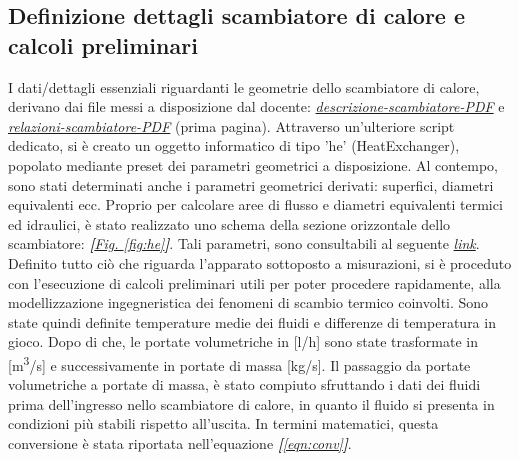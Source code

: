 \documentclass[a4paper,10pt]{article}                                                                                       %
\begin{document}
\subsection{Definizione dettagli scambiatore di calore e calcoli preliminari}                                               %
\label{subsec:hedef_precalcs}                                                                                               %
  I dati/dettagli essenziali riguardanti le geometrie dello scambiatore di calore, derivano dai file messi a disposizione
  dal docente:
  \textit{\href{https://github.com/CristianMerli/DataAnalysis/blob/master/lab_doc/DescrizioneScambiatore.pdf}{descrizione-scambiatore-PDF}}
  e \textit{\href{https://github.com/CristianMerli/DataAnalysis/blob/master/lab_doc/RelazioniScambiatore.pdf}{relazioni-scambiatore-PDF}}
  (prima pagina). Attraverso un'ulteriore script dedicato, si è creato un oggetto informatico di tipo 'he' (HeatExchanger),
  popolato mediante preset dei parametri geometrici a disposizione. Al contempo, sono stati determinati anche i parametri
  geometrici derivati: superfici, diametri equivalenti ecc. Proprio per calcolare aree di flusso e diametri equivalenti
  termici ed idraulici, è stato realizzato uno schema della sezione orizzontale dello scambiatore:
  \textit{\textbf{[}\hyperref[fig:he]{Fig. }\ref{fig:he}\textbf{]}}. Tali parametri, sono consultabili al seguente
  \textit{\href{https://github.com/CristianMerli/DataAnalysis/blob/master/final_doc/code_exports/output/he.txt}{link}}.
  Definito tutto ciò che riguarda l'apparato sottoposto a misurazioni, si è proceduto con l'esecuzione di calcoli
  preliminari utili per poter procedere rapidamente, alla modellizzazione ingegneristica dei fenomeni di scambio termico
  coinvolti. Sono state quindi definite temperature medie dei fluidi e differenze di temperatura in gioco. Dopo di che, le
  portate volumetriche in [l/h] sono state trasformate in [m\textsuperscript{3}/s] e successivamente in portate di massa
  [kg/s]. Il passaggio da portate volumetriche a portate di massa, è stato compiuto sfruttando i dati dei fluidi prima
  dell'ingresso nello scambiatore di calore, in quanto il fluido si presenta in condizioni più stabili rispetto
  all'uscita. In termini matematici, questa conversione è stata riportata nell'equazione
  \textit{\textbf{[}\ref{eqn:conv}\textbf{]}}.
\end{document}
